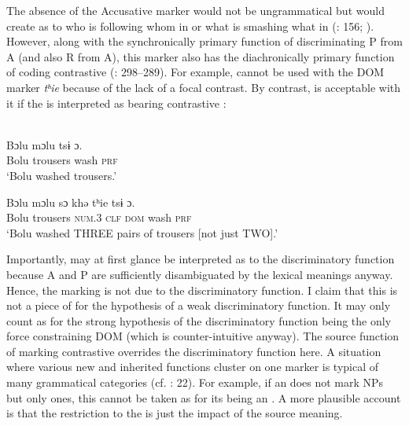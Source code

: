 \documentclass[output=paper]{langsci/langscibook}
\begin{document}
The absence of the Accusative marker would not be ungrammatical but would create  as to who is following whom in  or what is smashing what in  (\citealt{Matisoff1973}: 156; \citealt{Gerner2008}). However, along with the synchronically primary function of discriminating P from A (and also R from A), this marker also has the diachronically primary function of coding contrastive  (\citealt{Gerner2008}: 298–289). For example,  cannot be used with the DOM marker \textit{tʰ}\textit{ie} because of the lack of a focal contrast. By contrast,  is acceptable with it if the  is interpreted as bearing contrastive  \citep[299]{Gerner2008}:

\ea\label{ex:serzant:27}
\\
\ea\label{ex:serzant:27a}
\gll Bɔlu   mɔlu     tsɨ   ɔ.\\
     Bolu  trousers  wash  \textsc{prf}\\
\glt ‘Bolu washed trousers.’

\ex\label{ex:serzant:27b}
\gll  Bɔlu   mɔlu     sɔ   khǝ   tʰie   tsɨ   ɔ.\\
     Bolu  trousers  \textsc{num.}3  \textsc{clf}  \textsc{dom}   wash   \textsc{prf}\\
\glt ‘Bolu washed THREE pairs of trousers [not just TWO].’
\z
\z

Importantly,  may at first glance be interpreted as  to the discriminatory function because A and P are sufficiently disambiguated by the lexical meanings anyway. Hence, the marking is not due to the discriminatory function. I claim that this is not a piece of  for the hypothesis of a weak discriminatory function. It may only count as  for the strong hypothesis of the discriminatory function being the only force constraining DOM (which is counter-intuitive anyway). The source function of marking contrastive  overrides the discriminatory function here. A situation where various new and inherited functions cluster on one marker is typical of many grammatical categories (cf. \citealt{Hopper1991}: 22). For example, if an   does not mark   NPs but only  ones, this cannot be taken as  for its being an  . A more plausible account is that the restriction to the  is just the impact of the source meaning. 
\end{document}

